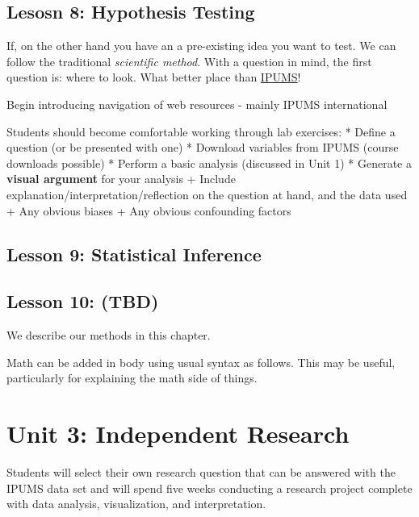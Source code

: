\documentclass[
]{book}
\begin{document}
\hypertarget{lesosn-8-hypothesis-testing}{%
\section*{Lesosn 8: Hypothesis Testing}\label{lesosn-8-hypothesis-testing}}

If, on the other hand you have an a pre-existing idea you want to test. We can follow the traditional \emph{scientific method}. With a question in mind, the first question is: where to look. What better place than \href{https://ipums.org}{IPUMS}!

Begin introducing navigation of web resources - mainly IPUMS international

Students should become comfortable working through lab exercises:
* Define a question (or be presented with one)
* Download variables from IPUMS (course downloads possible)
* Perform a basic analysis (discussed in Unit 1)
* Generate a \textbf{visual argument} for your analysis
+ Include explanation/interpretation/reflection on the question at hand, and the data used
+ Any obvious biases
+ Any obvious confounding factors

\hypertarget{lesson-9-statistical-inference}{%
\section*{Lesson 9: Statistical Inference}\label{lesson-9-statistical-inference}}

\hypertarget{lesson-10-tbd}{%
\section*{Lesson 10: (TBD)}\label{lesson-10-tbd}}

We describe our methods in this chapter.

Math can be added in body using usual syntax as follows. This may be useful, particularly for explaining the math side of things.

\hypertarget{unit-3-independent-research}{%
\chapter*{Unit 3: Independent Research}\label{unit-3-independent-research}}

Students will select their own research question that can be answered with the IPUMS data set and will spend five weeks conducting a research project complete with data analysis, visualization, and interpretation.
\end{document}
